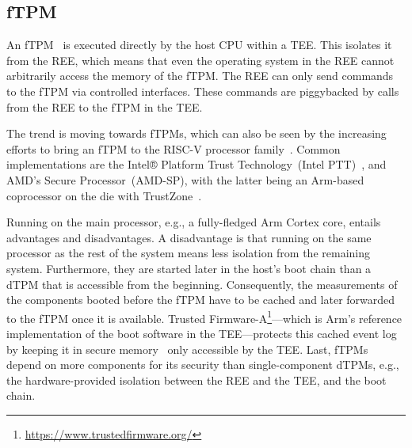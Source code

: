 \subsection{\Acl{fTPM}}



An fTPM~\cite{Raj2015, 197213} is executed directly by the host CPU within a \ac{TEE}.
This isolates it from the \ac{REE}, which means that even the operating system in the REE cannot arbitrarily access the memory of the fTPM\@.
The \ac{REE} can only send commands to the fTPM via controlled interfaces.
These commands are piggybacked by calls from the \ac{REE} to the fTPM in the \ac{TEE}.

The trend is moving towards fTPMs, which can also be seen by the increasing efforts to bring an fTPM to the RISC-V processor family~\cite{Boubakri2021}.
Common implementations are the Intel® Platform Trust Technology~(Intel PTT)~\cite{intelProcessorSecurity}, and AMD's Secure Processor~(AMD-SP), with the latter being an Arm-based coprocessor on the die with TrustZone~\cite{Khalid2020}.


Running on the main processor, e.g., a fully-fledged Arm Cortex core, entails advantages and disadvantages.
A disadvantage is that running on the same processor as the rest of the system means less isolation from the remaining system.
Furthermore, they are started later in the host's boot chain than a \ac{dTPM} that is accessible from the beginning.
Consequently, the measurements of the components booted before the fTPM have to be cached and later forwarded to the \ac{fTPM} once it is available.
Trusted Firmware-A\footnote{\url{https://www.trustedfirmware.org/}}---which is Arm's reference implementation of the boot software in the \ac{TEE}---protects this cached event log by keeping it in secure memory~\cite{tf-a-measured-boot} only accessible by the \ac{TEE}.
Last, fTPMs depend on more components for its security than single-component \acp{dTPM}, e.g., the hardware-provided isolation between the \ac{REE} and the \ac{TEE}, and the boot chain.

